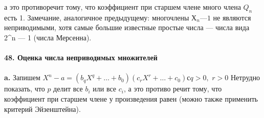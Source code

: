 \documentclass{../../template/mai_book}
\begin{document}
{\newpage
\noindent а это противоречит тому, что коэффициент при старшем члене много­\linebreak
члена $Q_n$ есть 1. Замечание, аналогичное предыдущему: многочлены\linebreak
$Х_n — 1$ не являются неприводимыми, хотя самые большие известные\linebreak
простые числа — числа вида 2^{n} — 1 (числа Мерсенна).\\
\\
\noindent\textbf{48. Оценка числа неприводимых множителей}\\
\\
\hspace*{15pt}\textbf{a.} Запишем $X^{n} - a = (b_{q}X^{q}+\ldots+ b_0)(c_{r}X^r+\ldots+c_0) с q > 0,$\linebreak
$r > 0$ Нетрудно показать, что $p$ делит все $b_i$ или все $c_i$, а это противо­\linebreak
речит тому, что коэффициент при старшем члене у произведения равен (можно также применить критерий Эйзенштейна).\\

}
\end{document}

